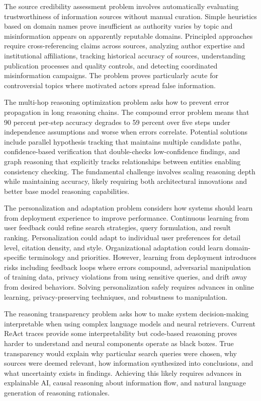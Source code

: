 The source credibility assessment problem involves automatically evaluating trustworthiness of information sources without manual curation. Simple heuristics based on domain names prove insufficient as authority varies by topic and misinformation appears on apparently reputable domains. Principled approaches require cross-referencing claims across sources, analyzing author expertise and institutional affiliations, tracking historical accuracy of sources, understanding publication processes and quality controls, and detecting coordinated misinformation campaigns. The problem proves particularly acute for controversial topics where motivated actors spread false information.

The multi-hop reasoning optimization problem asks how to prevent error propagation in long reasoning chains. The compound error problem means that 90 percent per-step accuracy degrades to 59 percent over five steps under independence assumptions and worse when errors correlate. Potential solutions include parallel hypothesis tracking that maintains multiple candidate paths, confidence-based verification that double-checks low-confidence findings, and graph reasoning that explicitly tracks relationships between entities enabling consistency checking. The fundamental challenge involves scaling reasoning depth while maintaining accuracy, likely requiring both architectural innovations and better base model reasoning capabilities.

The personalization and adaptation problem considers how systems should learn from deployment experience to improve performance. Continuous learning from user feedback could refine search strategies, query formulation, and result ranking. Personalization could adapt to individual user preferences for detail level, citation density, and style. Organizational adaptation could learn domain-specific terminology and priorities. However, learning from deployment introduces risks including feedback loops where errors compound, adversarial manipulation of training data, privacy violations from using sensitive queries, and drift away from desired behaviors. Solving personalization safely requires advances in online learning, privacy-preserving techniques, and robustness to manipulation.

The reasoning transparency problem asks how to make system decision-making interpretable when using complex language models and neural retrievers. Current ReAct traces provide some interpretability but code-based reasoning proves harder to understand and neural components operate as black boxes. True transparency would explain why particular search queries were chosen, why sources were deemed relevant, how information synthesized into conclusions, and what uncertainty exists in findings. Achieving this likely requires advances in explainable AI, causal reasoning about information flow, and natural language generation of reasoning rationales.

